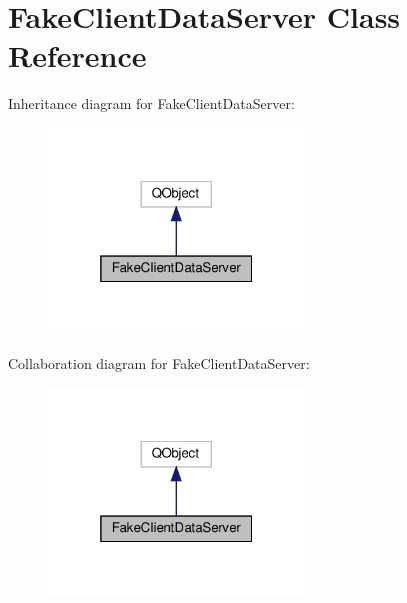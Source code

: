 \hypertarget{classFakeClientDataServer}{}\section{Fake\+Client\+Data\+Server Class Reference}
\label{classFakeClientDataServer}


Inheritance diagram for Fake\+Client\+Data\+Server\+:
\nopagebreak
\begin{figure}[H]
\begin{center}
\leavevmode
\includegraphics[width=193pt]{classFakeClientDataServer__inherit__graph}
\end{center}
\end{figure}


Collaboration diagram for Fake\+Client\+Data\+Server\+:
\nopagebreak
\begin{figure}[H]
\begin{center}
\leavevmode
\includegraphics[width=193pt]{classFakeClientDataServer__coll__graph}
\end{center}
\end{figure}
